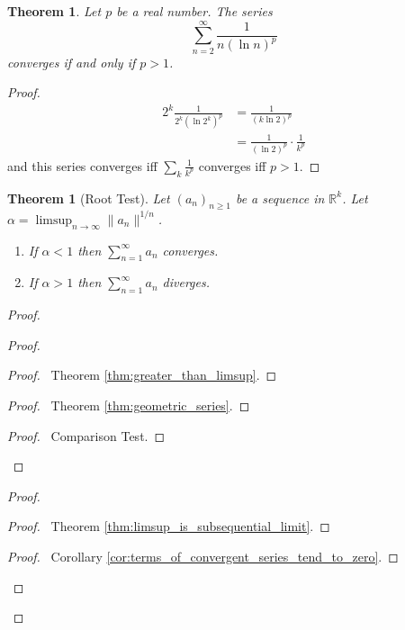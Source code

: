 \documentclass{book}
\let\qed\relax
\newtheorem{thm}[prop]{Theorem}
\theoremstyle{definition}
\begin{document}

\begin{thm}
Let $p$ be a real number. The series
\[ \sum_{n=2}^\infty \frac{1}{n(\ln n)^p} \]
converges if and only if $p > 1$.
\end{thm}

\begin{proof}
\pf
\begin{align*}
2^k \frac{1}{2^k (\ln 2^k)^p} & = \frac{1}{(k \ln 2)^p} \\
& = \frac{1}{(\ln 2)^p} \cdot \frac{1}{k^p}
\end{align*}
and this series converges iff $\sum_k \frac{1}{k^p}$ converges iff $p > 1$. \qed
\end{proof}

\begin{thm}[Root Test]
Let $(a_n)_{n \geq 1}$ be a sequence in $\mathbb{R}^k$. Let $\alpha = \limsup_{n \rightarrow \infty} \|a_n\|^{1/n}$.
\begin{enumerate}
\item If $\alpha < 1$ then $\sum_{n=1}^\infty a_n$ converges.
\item If $\alpha > 1$ then $\sum_{n=1}^\infty a_n$ diverges.
\end{enumerate}
\end{thm}

\begin{proof}
\pf
{}
\begin{proof}
	\begin{proof}
		\pf\ Theorem \ref{thm:greater_than_limsup}.
	\end{proof}
	\begin{proof}
		\pf\ Theorem \ref{thm:geometric_series}.
	\end{proof}
	\begin{proof}
		\pf\ Comparison Test.
	\end{proof}
\end{proof}
\begin{proof}
	\begin{proof}
		\pf\ Theorem \ref{thm:limsup_is_subsequential_limit}.
	\end{proof}
	\begin{proof}
		\pf\ Corollary \ref{cor:terms_of_convergent_series_tend_to_zero}.
	\end{proof}
\end{proof}
\qed
\end{proof}
\end{document}
